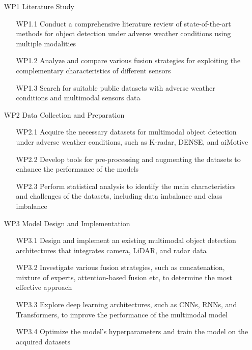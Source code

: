 \documentclass[rnd]{mas_proposal}
\begin{document}
\begin{enumerate}
    
      \item[WP1] Literature Study
      \begin{itemize}
            
            \item[WP1.1] Conduct a comprehensive literature review of state-of-the-art methods for object detection under adverse weather conditions using multiple modalities
            \item[WP1.2] Analyze and compare various fusion strategies for exploiting the complementary characteristics of different sensors 
            \item[WP1.3] Search for suitable public datasets with adverse weather conditions and multimodal sensors data
            
      \end{itemize}


      \item[WP2] Data Collection and Preparation
      \begin{itemize}
            
            \item[WP2.1] Acquire the necessary datasets for multimodal object detection under adverse weather conditions, such as K-radar, DENSE, and aiMotive
            \item[WP2.2] Develop tools for pre-processing and augmenting the datasets to enhance the performance of the models
            \item[WP2.3] Perform statistical analysis to identify the main characteristics and challenges of the datasets, including data imbalance and class imbalance
            
      \end{itemize}

      \item[WP3] Model Design and Implementation
      \begin{itemize}
            
            \item[WP3.1] Design and implement an existing multimodal object detection architectures that integrates camera, LiDAR, and radar data
            \item[WP3.2] Investigate various fusion strategies, such as concatenation, mixture of experts, attention-based fusion etc, to  determine the most effective approach
            \item[WP3.3] Explore deep learning architectures, such as CNNs, RNNs, and Transformers, to improve the performance of the multimodal model
            \item[WP3.4] Optimize the model's hyperparameters and train the model on the acquired datasets
      

\end{itemize}
\end{enumerate}
\end{document}
